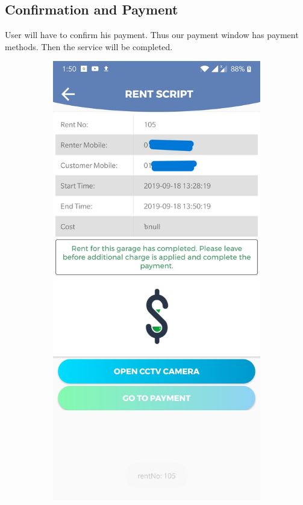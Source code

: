 \documentclass[12pt, english]{article}
\begin{document}
\subsection{Confirmation and Payment}
User will have to confirm his payment. Thus our payment window has payment methods. Then the service will be completed.
\begin{figure}[h!]
    \centering
    \begin{subfigure}[t]{0.4\textwidth}
    \includegraphics[width=\linewidth]{Payment/payment_notification.jpg}

\end{subfigure}
\end{figure}
\end{document}
